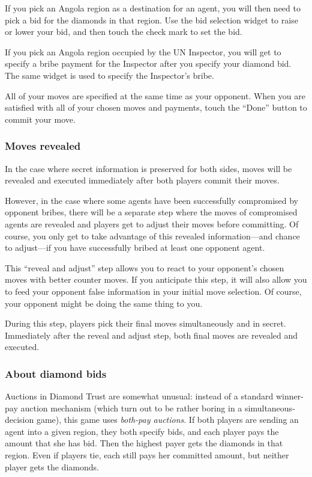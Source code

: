 \documentclass[8pt]{extbook}
\begin{document}
If you pick an Angola region as a destination for an agent, you will then need to pick a bid for the diamonds in that region.  Use the bid selection widget to raise or lower your bid, and then touch the check mark to set the bid.

If you pick an Angola region occupied by the UN Inspector, you will get to specify a bribe payment for the Inspector after you specify your diamond bid.  The same widget is used to specify the Inspector's bribe.

All of your moves are specified at the same time as your opponent.  When you are satisfied with all of your chosen moves and payments, touch the ``Done'' button to commit your move.

\subsubsection{Moves revealed}
\label{sec:movesRevealed}
In the case where secret information is preserved for both sides, moves will be revealed and executed immediately after both players commit their moves.

However, in the case where some agents have been successfully compromised by opponent bribes, there will be a separate step where the moves of compromised agents are revealed and players get to adjust their moves before committing.  Of course, you only get to take advantage of this revealed information---and chance to adjust---if you have successfully bribed at least one opponent agent.

This ``reveal and adjust'' step allows you to react to your opponent's chosen moves with better counter moves.  If you anticipate this step, it will also allow you to feed your opponent false information in your initial move selection.  Of course, your opponent might be doing the same thing to you.

During this step, players pick their final moves simultaneously and in secret.  Immediately after the reveal and adjust step, both final moves are revealed and executed.

\subsubsection{About diamond bids}
\label{sec:aboutBids}
Auctions in Diamond Trust are somewhat unusual:  instead of a standard winner-pay auction mechanism (which turn out to be rather boring in a simultaneous-decision game), this game uses {\it both-pay auctions}.  If both players are sending an agent into a given region, they both specify bids, and each player pays the amount that she has bid.  Then the highest payer gets the diamonds in that region.  Even if players tie, each still pays her committed amount, but neither player gets the diamonds.
\end{document}

